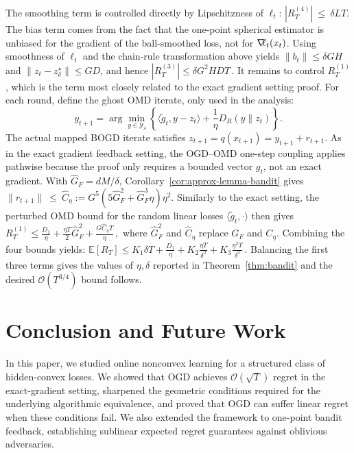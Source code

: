 \documentclass[a4paper,11pt,fullpage]{article}
\def\Y{{\mathcal Y}}
\theoremstyle{plain}
\theoremstyle{definition}
\theoremstyle{plain}
\renewcommand{\leq}{~\le~}
\let\nablaold\nabla
\renewcommand{\nabla}{\nablaold\mkern-2.5mu}
\begin{document}
The smoothing term is controlled directly by Lipschitzness of $\ell_t$: $|R_T^{(4)}| \leq \delta LT.$ 
The bias term comes from the fact that the one-point spherical estimator is unbiased for the gradient of the ball-smoothed loss, not for $\nabla\ell_t(x_t)$. Using
smoothness of \(\ell_t\) and the chain-rule transformation above yields $\|b_t\|\le \delta GH$ and $\|z_t-z^\star_\delta\|\le GD$, and hence $|R_T^{(3)}|\le \delta G^2HDT\,.$ 
It remains to control \(R_T^{(1)}\), which is the term most closely related to the exact gradient setting proof. For each round, define the ghost OMD iterate, only used in the analysis: 
\begin{equation*}
    y_{t+1}
    =
    \arg\min_{y\in\Y_\delta}
    \left\{
        \langle \tilde g_t,y-z_t\rangle
        +
        \frac1\eta D_R(y\|z_t)
    \right\}.
\end{equation*}
The actual
mapped BOGD iterate satisfies $z_{t+1}=q(x_{t+1})=y_{t+1}+r_{t+1}$. 
As in the exact gradient feedback setting, the OGD--OMD one-step coupling applies pathwise because the proof only requires a bounded vector $g_t$, not an exact gradient.
With $\hat G_F=dM/\delta$, Corollary~\ref{cor:approx-lemma-bandit} gives $\|r_{t+1}\| \leq \hat C_\eta:= G^5\left(5\hat G_F^2+\hat G_F^3\eta\right)\eta^2 .$
Similarly to the exact setting, the perturbed OMD bound for the random linear losses
\(\langle \tilde g_t,\cdot\rangle\) then gives $R_T^{(1)}
    \le
    \frac{D_1}{\eta}
    +
    \frac{\eta T}{2} \hat{G}_F^2
    + \frac{G \hat C_\eta T}{\eta}\,,$ 
    where $\hat{G}_F^2$ and $\hat C_\eta$ replace $G_F$ and $C_\eta$. 
Combining the four bounds yields: 
$\mathbb{E}[R_T]
    \le
    K_1\delta T
    +
    \frac{D_1}{\eta}
    +
    K_2\frac{\eta T}{\delta^2}
    +
    K_3\frac{\eta^2T}{\delta^3}\,.$
Balancing the first three terms gives the values of $\eta, \delta$ reported in Theorem~\ref{thm:bandit} and the desired
$\mathcal{O}(T^{3/4})$ bound follows.

\section{Conclusion and Future Work}

In this paper, we studied online nonconvex learning for a structured class of hidden-convex losses. 
We showed that OGD achieves $\mathcal{O}(\sqrt{T})$ regret in the exact-gradient setting, sharpened the geometric conditions required for the underlying algorithmic equivalence, and proved that OGD can suffer linear regret when these conditions fail. 
We also extended the framework to one-point bandit feedback, establishing sublinear expected regret guarantees against oblivious adversaries.
\end{document}
